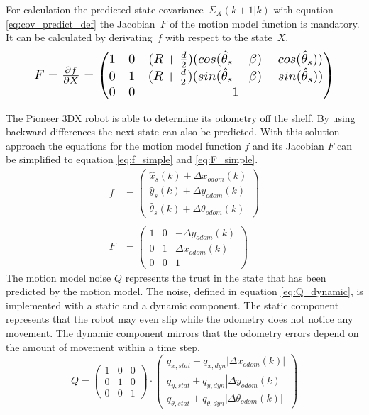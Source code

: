 For calculation the predicted state \mbox{covariance $\Sigma_{X}(k+1|k)$} with equation \eqref{eq:cov_predict_def} the \mbox{Jacobian $F$} of the motion model function is mandatory. It can be calculated by \mbox{derivating $f$} with respect to the \mbox{state $X$.} \cite{Maneewarn}
\begin{equation}\label{eq:MotionModel}
    \resizebox{0.88\hsize}{!}{%
        $F = \frac{\partial f}{\partial X} = \begin{pmatrix} 1 & 0 & (R+{\frac{d}{2}})(cos(\hat{\theta}_s+ \beta)-cos(\hat{\theta}_s)) \\ 0 & 1 & (R+\frac{d}{2})(sin(\hat{\theta}_s+ \beta)-sin(\hat{\theta}_s)) \\ 0 & 0 & 1\end{pmatrix}$%
        }
\end{equation}

The Pioneer 3DX robot is able to determine its odometry off the shelf. By using backward differences the next state can also be predicted. With this solution approach the equations for the motion model function $f$ and its Jacobian $F$ can be simplified to equation \eqref{eq:f_simple} and \eqref{eq:F_simple}. 
\begin{align}
f &= \begin{pmatrix} \hat{x}_s(k) + \Delta x_{odom}(k) \\ \hat{y}_s(k) + \Delta y_{odom}(k) \\ \hat{\theta}_s(k) + \Delta \theta_{odom}(k)\end{pmatrix}
\label{eq:f_simple} \\ \nonumber \\
F &= \begin{pmatrix} 1 & 0 & - \Delta y_{odom}(k) \\ 0 & 1 & \Delta x_{odom}(k) \\ 0 & 0 & 1\end{pmatrix} \label{eq:F_simple}
\end{align}
The motion model noise $Q$ represents the trust in the state that has been predicted by the motion model. The noise, defined in equation \eqref{eq:Q_dynamic}, is implemented with a static and a dynamic component. The static component represents that the robot may even slip while the odometry does not notice any movement. The dynamic component mirrors that the odometry errors depend on the amount of movement within a time step.
\begin{equation}
Q = \begin{pmatrix} 1 & 0 & 0 \\ 0 & 1 & 0 \\ 0 & 0 & 1\end{pmatrix} \cdot \begin{pmatrix} q_{x,stat} + q_{x,dyn} |\Delta x_{odom}(k)| \\ q_{y,stat} + q_{y,dyn} |\Delta y_{odom}(k)|  \\ q_{\theta,stat} + q_{\theta,dyn} |\Delta \theta_{odom}(k)| \end{pmatrix}
\label{eq:Q_dynamic}
\end{equation}


